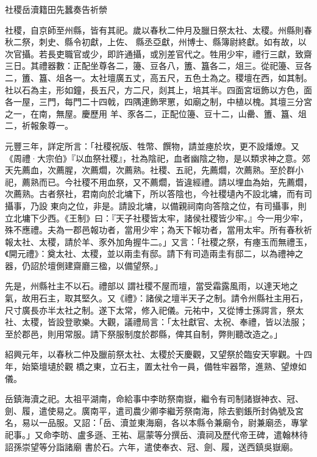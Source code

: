 
\begin{pinyinscope}

 社稷岳瀆籍田先蠶奏告祈禜



 社稷，自京師至州縣，皆有其祀。歲以春秋二仲月及臘日祭太社、太稷。州縣則春秋二祭，刺史、縣令初獻，上佐、
 縣丞亞獻，州博士、縣簿尉終獻。如有故，以次官攝。若長吏職官或少，即許通攝，或別差官代之。牲用少牢，禮行三獻，致齋三日。其禮器數：正配坐尊各二，籩、豆各八，簠、簋各二，俎三。從祀籩、豆各二，簠、簋、俎各一。太社壇廣五丈，高五尺，五色土為之。稷壇在西，如其制。社以石為主，形如鐘，長五尺，方二尺，剡其上，培其半。四面宮垣飾以方色，面各一屋，三門，每門二十四戟，四隅連飾罘罳，如廟之制，中植以槐。其壇三分宮之一，在南，無屋。慶歷用
 羊、豕各二，正配位籩、豆十二，山罍、簠、簋、俎二，祈報象尊一。



 元豐三年，詳定所言：「社稷祝版、牲幣、饌物，請並瘞於坎，更不設燔燎。又《周禮·大宗伯》『以血祭社稷』，社為陰祀，血者幽陰之物，是以類求神之意。郊天先薦血，次薦腥，次薦爓，次薦熟。社稷、五祀，先薦爓，次薦熟。至於群小祀，薦熟而已。今社稷不用血祭，又不薦爓，皆違經禮。請以埋血為始，先薦爓，次薦熟。古者祭社，君南向於北墉下，所以答陰也，今社稷壝內不設北墉，而有司攝事，乃設
 東向之位，非是。請設北墉，以備親祠南向答陰之位，有司攝事，則立北墉下少西。《王制》曰：『天子社稷皆太牢，諸侯社稷皆少牢。』今一用少牢，殊不應禮。夫為一郡邑報功者，當用少牢；為天下報功者，當用太牢。所有春秋祈報太社、太稷，請於羊、豕外加角握牛二。」又言：「社稷之祭，有瘞玉而無禮玉，《開元禮》：奠太社、太稷，並以兩圭有邸。請下有司造兩圭有邸二，以為禮神之器，仍詔於壇側建齋廳三楹，以備望祭。」



 先是，州縣社主不以石。禮部以
 謂社稷不屋而壇，當受霜露風雨，以達天地之氣，故用石主，取其堅久。又《禮》：諸侯之壇半天子之制。請令州縣社主用石，尺寸廣長亦半太社之制。遂下太常，修入祀儀。元祐中，又從博士孫諤言，祭太社、太稷，皆設登歌樂。大觀，議禮局言：「太社獻官、太祝、奉禮，皆以法服；至於郡邑，則用常服。請下祭服制度於郡縣，俾其自制，弊則聽改造之。」



 紹興元年，以春秋二仲及臘前祭太社、太稷於天慶觀，又望祭於臨安天寧觀。十四年，始築壇壝於觀
 橋之東，立石主，置太社令一員，備牲牢器幣，進熟、望燎如儀。



 岳鎮海瀆之祀。太祖平湖南，命給事中李昉祭南嶽，繼令有司制諸嶽神衣、冠、劍、履，遣使易之。廣南平，遣司農少卿李繼芳祭南海，除去劉鋹所封偽號及宮名，易以一品服。又詔：「岳、瀆並東海廟，各以本縣令兼廟令，尉兼廟丞，專掌祀事。」又命李昉、盧多遜、王祐、扈蒙等分撰岳、瀆祠及歷代帝王碑，遣翰林待詔孫崇望等分詣諸廟
 書於石。六年，遣使奉衣、冠、劍、履，送西鎮吳嶽廟。




\end{pinyinscope}
